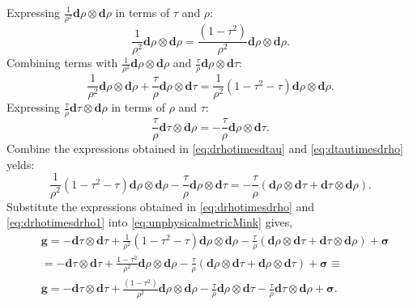 Expressing $\frac{1}{\rho^2} \mathbf{d} \rho \otimes \mathbf{d} \rho$ in terms of $\tau$ and $\rho$:
\begin{equation}\label{eq:drhotimesdrho}
  \frac{1}{\rho^2} \mathbf{d} \rho \otimes \mathbf{d} \rho = \frac{\left(1-\tau^2\right)}{\rho^2} \mathbf{d} \rho \otimes \mathbf{d} \rho .
\end{equation}
Combining terms with $\frac{1}{\rho^2} \mathbf{d} \rho \otimes \mathbf{d} \rho$ and $\frac{\tau}{\rho} \mathbf{d} \rho \otimes \mathbf{d} \tau$:
\begin{equation}\label{eq:drhotimesdtau}
  \frac{1}{\rho^2} \mathbf{d} \rho \otimes \mathbf{d} \rho + \frac{\tau}{\rho} \mathbf{d} \rho \otimes \mathbf{d} \tau = \frac{1}{\rho^2} \left(1 - \tau^2 - \tau\right) \mathbf{d} \rho \otimes \mathbf{d} \rho .
\end{equation}
Expressing $\frac{\tau}{\rho} \mathbf{d} \tau \otimes \mathbf{d} \rho$ in terms of $\rho$ and $\tau$:
\begin{equation}\label{eq:dtautimesdrho}
  \frac{\tau}{\rho} \mathbf{d} \tau \otimes \mathbf{d} \rho = -\frac{\tau}{\rho} \mathbf{d} \rho \otimes \mathbf{d} \tau .
\end{equation}
Combine the expressions obtained in \eqref{eq:drhotimesdtau} and \eqref{eq:dtautimesdrho} yelds:
\begin{equation}\label{eq:drhotimesdrho1}
  \frac{1}{\rho^2} \left(1 - \tau^2 - \tau\right) \mathbf{d} \rho \otimes \mathbf{d} \rho -\frac{\tau}{\rho} \mathbf{d} \rho \otimes \mathbf{d} \tau = -\frac{\tau}{\rho} \left(\mathbf{d} \rho \otimes \mathbf{d} \tau + \mathbf{d} \tau \otimes \mathbf{d} \rho\right).
\end{equation}
Substitute the expressions obtained in \eqref{eq:drhotimesdrho} and \eqref{eq:drhotimesdrho1} into \eqref{eq:unphysicalmetricMink} gives,
\begin{align}\label{eq:unphysicalmetricMinkFinal}
  & \boldsymbol{g} = -\mathbf{d} \tau \otimes \mathbf{d} \tau + \frac{1}{\rho^2} \left(1 - \tau^2 - \tau\right) \mathbf{d} \rho \otimes \mathbf{d} \rho -\frac{\tau}{\rho} \left(\mathbf{d} \rho \otimes \mathbf{d} \tau + \mathbf{d} \tau \otimes \mathbf{d} \rho\right) + \boldsymbol{\sigma} \nonumber \\
  & = -\mathbf{d} \tau \otimes \mathbf{d} \tau + \frac{1 - \tau^2}{\rho^2} \mathbf{d} \rho \otimes \mathbf{d} \rho -\frac{\tau}{\rho} \left(\mathbf{d} \rho \otimes \mathbf{d} \tau + \mathbf{d} \rho \otimes \mathbf{d} \tau\right) + \boldsymbol{\sigma} \equiv \nonumber \\
  & \boldsymbol{g}=-\mathbf{d} \tau \otimes \mathbf{d} \tau+\frac{\left(1-\tau^2\right)}{\rho^2} \mathbf{d} \rho \otimes \mathbf{d} \rho-\frac{\tau}{\rho} \mathbf{d} \rho \otimes \mathbf{d} \tau-\frac{\tau}{\rho} \mathbf{d} \tau \otimes \mathbf{d} \rho+\boldsymbol{\sigma}.
\end{align}
